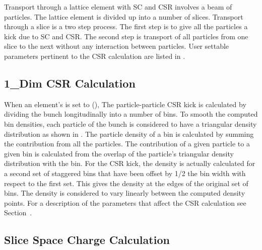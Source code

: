 Transport through a lattice element with SC and CSR involves a beam of particles. The lattice
element is divided up into a number of slices. Transport through a slice is a two step process. The
first step is to give all the particles a kick due to SC and CSR. The second step is transport of
all particles from one slice to the next without any interaction between particles. User settable
parameters pertinent to the CSR calculation are listed in .

\subsection{1\_Dim CSR Calculation}
\label{s:csr.1d}

When an element's  is set to  (), The particle-particle
CSR kick is calculated by dividing the bunch longitudinally into a number of bins. To smooth the
computed bin densities, each particle of the bunch is considered to have a triangular density
distribution as shown in .  The particle density of a bin is calculated by summing
the contribution from all the particles. The contribution of a given particle to a given bin is
calculated from the overlap of the particle's triangular density distribution with the bin. For the
CSR kick, the density is actually calculated for a second set of staggered bins that have been
offset by 1/2 the bin width with respect to the first set. This gives the density at the edges of
the original set of bins. The density is considered to vary linearly between the computed density
points. For a description of the parameters that affect the CSR calculation see
Section~.

\subsection{Slice Space Charge Calculation}
\label{s:sc.slice}

